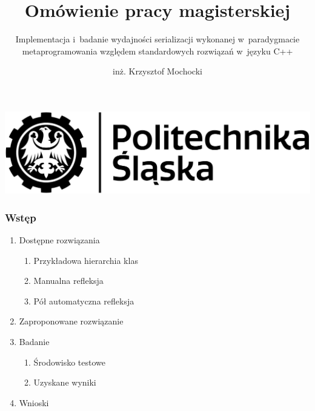 \documentclass[12pt]{beamer}
\subtitle{Implementacja i~badanie wydajności serializacji wykonanej w~paradygmacie metaprogramowania względem standardowych rozwiązań w~języku C++}
\title{Omówienie pracy magisterskiej}
\author[inż. Krzysztof Mochocki]{inż. Krzysztof Mochocki}
\date{}
\begin{document}
	\begin{frame}
		\centering\includegraphics[width=0.2137\framewidth, keepaspectratio=true]{../paper/img/black_and_wtransparent_polsl_horizontal_logo.png}
		\maketitle
	\end{frame}

	\begin{frame}
		\frametitle{Wstęp}
		\begin{enumerate}
			\item Dostępne rozwiązania
			\begin{enumerate}
				\item Przykładowa hierarchia klas
				\item Manualna refleksja
				\item Pół automatyczna refleksja
			\end{enumerate}
			\item Zaproponowane rozwiązanie
			\item Badanie
			\begin{enumerate}
				\item Środowisko testowe
				\item Uzyskane wyniki
			\end{enumerate}
			\item Wnioski
		\end{enumerate}
	\end{frame}
\end{document}
